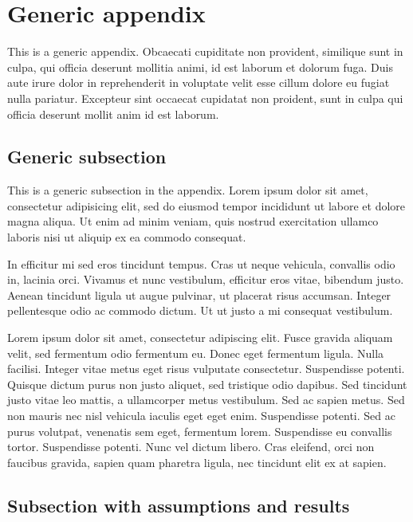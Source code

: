 \documentclass[letterpaper,11pt,leqno]{article}
\newcommand{\bib}{iibproject.bib}
\begin{document}

\appendix

\section{Generic appendix}\label{a:appendix1}

This is a generic appendix. Obcaecati cupiditate non provident, similique sunt in culpa, qui officia deserunt mollitia animi, id est laborum et dolorum fuga. Duis aute irure dolor in reprehenderit in voluptate velit esse cillum dolore eu fugiat nulla pariatur. Excepteur sint occaecat cupidatat non proident, sunt in culpa qui officia deserunt mollit anim id est laborum. 

\subsection{Generic subsection} 

This is a generic subsection in the appendix. Lorem ipsum dolor sit amet, consectetur adipisicing elit, sed do eiusmod tempor incididunt ut labore et dolore magna aliqua. Ut enim ad minim veniam, quis nostrud exercitation ullamco laboris nisi ut aliquip ex ea commodo consequat. 

In efficitur mi sed eros tincidunt tempus. Cras ut neque vehicula, convallis odio in, lacinia orci. Vivamus et nunc vestibulum, efficitur eros vitae, bibendum justo. Aenean tincidunt ligula ut augue pulvinar, ut placerat risus accumsan. Integer pellentesque odio ac commodo dictum. Ut ut justo a mi consequat vestibulum. 

Lorem ipsum dolor sit amet, consectetur adipiscing elit. Fusce gravida aliquam velit, sed fermentum odio fermentum eu. Donec eget fermentum ligula. Nulla facilisi. Integer vitae metus eget risus vulputate consectetur. Suspendisse potenti. Quisque dictum purus non justo aliquet, sed tristique odio dapibus. Sed tincidunt justo vitae leo mattis, a ullamcorper metus vestibulum. Sed ac sapien metus. Sed non mauris nec nisl vehicula iaculis eget eget enim. Suspendisse potenti. Sed ac purus volutpat, venenatis sem eget, fermentum lorem. Suspendisse eu convallis tortor. Suspendisse potenti. Nunc vel dictum libero. Cras eleifend, orci non faucibus gravida, sapien quam pharetra ligula, nec tincidunt elit ex at sapien. 

\subsection{Subsection with assumptions and results}
\end{document}
